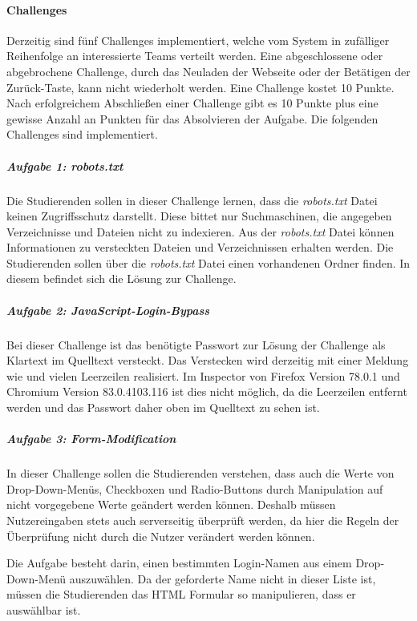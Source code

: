 \paragraph{Challenges} \label{para:Challenges}
Derzeitig sind fünf Challenges implementiert, welche vom System in zufälliger Reihenfolge an interessierte Teams verteilt werden. Eine abgeschlossene oder abgebrochene Challenge, durch das Neuladen der Webseite oder der Betätigen der Zurück-Taste, kann nicht wiederholt werden. Eine Challenge kostet 10 Punkte. Nach erfolgreichem Abschließen einer Challenge gibt es 10 Punkte plus eine gewisse Anzahl an Punkten für das Absolvieren der Aufgabe. Die folgenden Challenges sind implementiert.\cite[S.19-20]{abtsUeberarbeitungUndErweiterung2016}

\subparagraph{Aufgabe 1: robots.txt}\label{subpara:Aufgabe_1_robots.txt}
Die Studierenden sollen in dieser Challenge lernen, dass die \textit{robots.txt} Datei keinen Zugriffsschutz darstellt. Diese bittet nur Suchmaschinen, die angegeben Verzeichnisse und Dateien nicht zu indexieren. Aus der \textit{robots.txt} Datei können Informationen zu versteckten Dateien und Verzeichnissen erhalten werden. Die Studierenden sollen über die \textit{robots.txt} Datei einen vorhandenen Ordner finden. In diesem befindet sich die Lösung zur Challenge.

\subparagraph{Aufgabe 2: JavaScript-Login-Bypass}\label{subpara:Aufgabe_2_JavaScript-Login-Bypass}
Bei dieser Challenge ist das benötigte Passwort zur Lösung der Challenge als Klartext im Quelltext versteckt. Das Verstecken wird derzeitig mit einer Meldung wie  und vielen Leerzeilen realisiert. Im Inspector von Firefox Version 78.0.1 und Chromium Version 83.0.4103.116 ist dies nicht möglich, da die Leerzeilen entfernt werden und das Passwort daher oben im Quelltext zu sehen ist.

\subparagraph{Aufgabe 3: Form-Modification}\label{subpara:Aufgabe_3_Form-Modification}
In dieser Challenge sollen die Studierenden verstehen, dass auch die Werte von Drop-Down-Menüs, Checkboxen und Radio-Buttons durch Manipulation auf nicht vorgegebene Werte geändert werden können. Deshalb müssen Nutzereingaben stets auch serverseitig überprüft werden, da hier die Regeln der Überprüfung nicht durch die Nutzer verändert werden können.

Die Aufgabe besteht darin, einen bestimmten Login-Namen aus einem Drop-Down-Menü auszuwählen. Da der geforderte Name nicht in dieser Liste ist, müssen die Studierenden das HTML Formular so manipulieren, dass er auswählbar ist.

